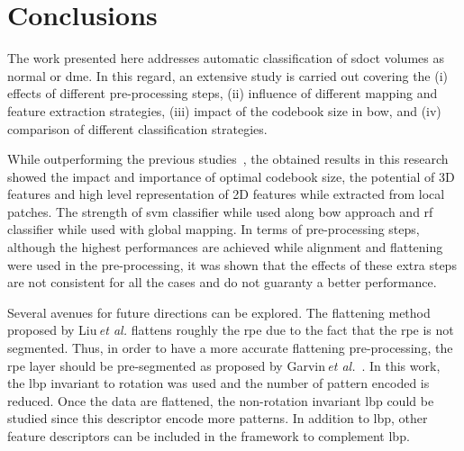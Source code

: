 \documentclass[review]{elsarticle}
\begin{document}
\maketitle

\linenumbers
\acresetall  %




%

\section{Conclusions}\label{sec:con}
The work presented here addresses automatic classification of \ac{sdoct} volumes as normal or \ac{dme}.
In this regard, an extensive study is carried out covering the
(i) effects of different pre-processing steps, 
(ii) influence of different mapping and feature extraction strategies,
(iii) impact of the codebook size in \ac{bow}, and
(iv) comparison of different classification strategies.

While outperforming the previous studies~\cite{Lemaintre2015miccaiOCT,Venhuizen2015}, the obtained results in this research showed the impact and importance of optimal codebook size, the potential of 3D features and high level representation of 2D features while extracted from local patches.
The strength of \ac{svm} classifier while used along \ac{bow} approach and \ac{rf} classifier while used with global mapping.
In terms of pre-processing steps, although the highest performances are achieved while alignment and flattening were used in the pre-processing, it was shown that the effects of these extra steps are not consistent for all the cases and do not guaranty a better performance.

Several avenues for future directions can be explored. The flattening method proposed by Liu\,\emph{et al.} flattens roughly the \ac{rpe} due to the fact that the \ac{rpe} is not segmented. Thus, in order to have a more accurate flattening pre-processing, the \ac{rpe} layer should be pre-segmented as proposed by Garvin\,\emph{et al.}~\cite{Garvin2009}. In this work, the \ac{lbp} invariant to rotation was used and the number of pattern encoded is reduced. Once the data are flattened, the non-rotation invariant \ac{lbp} could be studied since this descriptor encode more patterns. In addition to \ac{lbp}, other feature descriptors can be included in the framework to complement \ac{lbp}.
\end{document}
